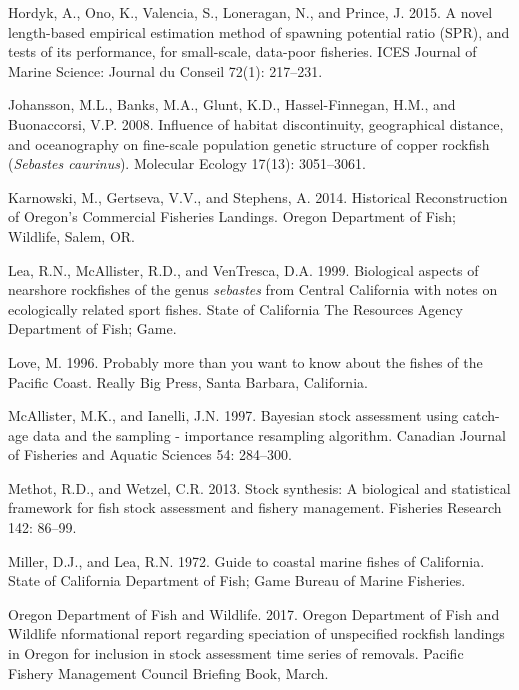 \documentclass[11pt,
  english,
  a4paper,
]{article}
\newlength{\cslhangindent}
\newenvironment{CSLReferences}[2] %
 {%
  \setlength{\parindent}{0pt}
  \ifodd #1 \everypar{\setlength{\hangindent}{\cslhangindent}}\ignorespaces\fi
  \ifnum #2 > 0
  \setlength{\parskip}{#2\baselineskip}
  \fi
 }%
 {}
\begin{document}
\begin{CSLReferences}{1}{0}
\leavevmode{}%
Hordyk, A., Ono, K., Valencia, S., Loneragan, N., and Prince, J. 2015. A novel length-based empirical estimation method of spawning potential ratio ({SPR}), and tests of its performance, for small-scale, data-poor fisheries. ICES Journal of Marine Science: Journal du Conseil 72(1): 217--231.

\leavevmode{}%
Johansson, M.L., Banks, M.A., Glunt, K.D., Hassel-Finnegan, H.M., and Buonaccorsi, V.P. 2008. Influence of habitat discontinuity, geographical distance, and oceanography on fine-scale population genetic structure of copper rockfish (\emph{{Sebastes} caurinus}). Molecular Ecology 17(13): 3051--3061.

\leavevmode{}%
Karnowski, M., Gertseva, V.V., and Stephens, A. 2014. Historical {Reconstruction} of {Oregon}'s {Commercial} {Fisheries} {Landings}. Oregon Department of Fish; Wildlife, Salem, OR.

\leavevmode{}%
Lea, R.N., McAllister, R.D., and VenTresca, D.A. 1999. Biological aspects of nearshore rockfishes of the genus \emph{sebastes} from {Central} {California} with notes on ecologically related sport fishes. State of California The Resources Agency Department of Fish; Game.

\leavevmode{}%
Love, M. 1996. Probably more than you want to know about the fishes of the {Pacific} {Coast}. Really Big Press, Santa Barbara, California.

\leavevmode{}%
McAllister, M.K., and Ianelli, J.N. 1997. Bayesian stock assessment using catch-age data and the sampling - importance resampling algorithm. Canadian Journal of Fisheries and Aquatic Sciences 54: 284--300.

\leavevmode{}%
Methot, R.D., and Wetzel, C.R. 2013. Stock synthesis: A biological and statistical framework for fish stock assessment and fishery management. Fisheries Research 142: 86--99.

\leavevmode{}%
Miller, D.J., and Lea, R.N. 1972. Guide to coastal marine fishes of {California}. State of California Department of Fish; Game Bureau of Marine Fisheries.

\leavevmode{}%
Oregon Department of Fish and Wildlife. 2017. {Oregon} {Department} of {Fish} and {Wildlife} nformational report regarding speciation of unspecified rockfish landings in {Oregon} for inclusion in stock assessment time series of removals. Pacific Fishery Management Council Briefing Book, March.


\end{CSLReferences}
\end{document}
